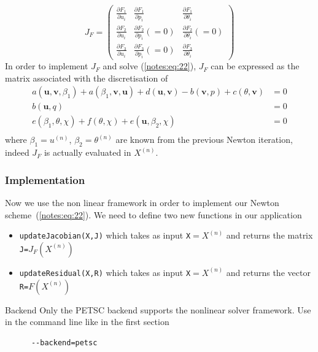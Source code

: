   \begin{equation}
    \label{notes:eq:35}
    J_F =
    \begin{pmatrix}
      \frac{\partial F_1}{\partial u_i} & \frac{\partial F_1}{\partial p_i} & \frac{\partial F_1}{\partial \theta_i} \\
      {\frac{\partial F_2}{\partial u_i}} & {\frac{\partial F_2}{\partial p_i}}(=0) & {\frac{\partial F_2}{\partial \theta_i}}(=0) \\
      \frac{\partial F_3}{\partial u_i} & {\frac{\partial F_3}{\partial p_i}}(=0) & \frac{\partial F_3}{\partial \theta_i}
    \end{pmatrix}
  \end{equation}
  In order to implement $J_F$ and solve (\ref{notes:eq:22}), $J_F$ can be
  expressed as the matrix associated with the discretisation of
  \begin{equation}
    \label{notes:eq:37}
    \begin{array}{rl}
      a(\mathbf{u},\mathbf{v},\beta_1) + a(\beta_1, \mathbf{v}, \mathbf{u})+d(\mathbf{u},\mathbf{v})-b(\mathbf{v},p)+c(\theta,\mathbf{v}) &= 0\\
      b(\mathbf{u},q)&=0\\
      e(\beta_1,\theta,\chi)+f(\theta,\chi)+e(\mathbf{u},\beta_2,\chi)&=0\\
    \end{array}
  \end{equation}
  where $\beta_1 = u^{(n)}$, $\beta_2=\theta^{(n)}$ are known from the
  previous Newton iteration, indeed $J_F$ is actually evaluated in $X^{(n)}$.

\subsubsection{\Feel Implementation}
  Now we use the \Feel non linear framework in order to implement our
  Newton scheme~(\ref{notes:eq:22}).
  We need to define two new functions in our application
  \begin{itemize}
  \item \texttt{updateJacobian(X,J)} which takes as input \texttt{X}$=X^{(n)}$ and returns the matrix \texttt{J=}$J_F(X^{(n)})$
  \item \texttt{updateResidual(X,R)} which takes as input \texttt{X}$=X^{(n)}$ and returns the vector \texttt{R=}$F(X^{(n)})$
  \end{itemize}

  \begin{remark}{Backend}
    Only the PETSC backend supports the nonlinear solver framework.
    Use  in the command line like in the first section
    \begin{lstlisting}
      --backend=petsc
    \end{lstlisting}
  \end{remark}

